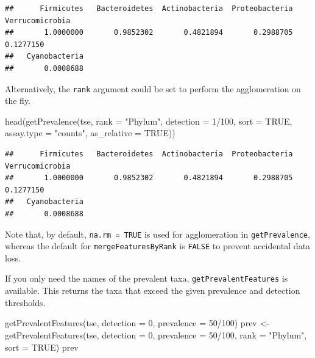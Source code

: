 \documentclass[
]{book}
\newenvironment{Shaded}{\begin{snugshade}}{\end{snugshade}}
\newcommand{\AttributeTok}[1]{\textcolor[rgb]{0.77,0.63,0.00}{#1}}
\newcommand{\ConstantTok}[1]{\textcolor[rgb]{0.00,0.00,0.00}{#1}}
\newcommand{\DecValTok}[1]{\textcolor[rgb]{0.00,0.00,0.81}{#1}}
\newcommand{\FunctionTok}[1]{\textcolor[rgb]{0.00,0.00,0.00}{#1}}
\newcommand{\NormalTok}[1]{#1}
\newcommand{\OtherTok}[1]{\textcolor[rgb]{0.56,0.35,0.01}{#1}}
\newcommand{\SpecialCharTok}[1]{\textcolor[rgb]{0.00,0.00,0.00}{#1}}
\newcommand{\StringTok}[1]{\textcolor[rgb]{0.31,0.60,0.02}{#1}}
\begin{document}
\begin{verbatim}
##      Firmicutes   Bacteroidetes  Actinobacteria  Proteobacteria Verrucomicrobia 
##       1.0000000       0.9852302       0.4821894       0.2988705       0.1277150 
##   Cyanobacteria 
##       0.0008688
\end{verbatim}

Alternatively, the \texttt{rank} argument could be set to perform the
agglomeration on the fly.

\begin{Shaded}
\begin{Highlighting}[]
\FunctionTok{head}\NormalTok{(}\FunctionTok{getPrevalence}\NormalTok{(tse, }\AttributeTok{rank =} \StringTok{"Phylum"}\NormalTok{, }\AttributeTok{detection =} \DecValTok{1}\SpecialCharTok{/}\DecValTok{100}\NormalTok{, }\AttributeTok{sort =} \ConstantTok{TRUE}\NormalTok{,}
                   \AttributeTok{assay.type =} \StringTok{"counts"}\NormalTok{, }\AttributeTok{as\_relative =} \ConstantTok{TRUE}\NormalTok{))}
\end{Highlighting}
\end{Shaded}

\begin{verbatim}
##      Firmicutes   Bacteroidetes  Actinobacteria  Proteobacteria Verrucomicrobia 
##       1.0000000       0.9852302       0.4821894       0.2988705       0.1277150 
##   Cyanobacteria 
##       0.0008688
\end{verbatim}

Note that, by default, \texttt{na.rm\ =\ TRUE} is used for agglomeration in
\texttt{getPrevalence}, whereas the default for \texttt{mergeFeaturesByRank} is
\texttt{FALSE} to prevent accidental data loss.

If you only need the names of the prevalent taxa, \texttt{getPrevalentFeatures}
is available. This returns the taxa that exceed the given prevalence
and detection thresholds.

\begin{Shaded}
\begin{Highlighting}[]
\FunctionTok{getPrevalentFeatures}\NormalTok{(tse, }\AttributeTok{detection =} \DecValTok{0}\NormalTok{, }\AttributeTok{prevalence =} \DecValTok{50}\SpecialCharTok{/}\DecValTok{100}\NormalTok{)}
\NormalTok{prev }\OtherTok{\textless{}{-}} \FunctionTok{getPrevalentFeatures}\NormalTok{(tse, }\AttributeTok{detection =} \DecValTok{0}\NormalTok{, }\AttributeTok{prevalence =} \DecValTok{50}\SpecialCharTok{/}\DecValTok{100}\NormalTok{,}
                         \AttributeTok{rank =} \StringTok{"Phylum"}\NormalTok{, }\AttributeTok{sort =} \ConstantTok{TRUE}\NormalTok{)}
\NormalTok{prev}
\end{Highlighting}
\end{Shaded}
\end{document}
